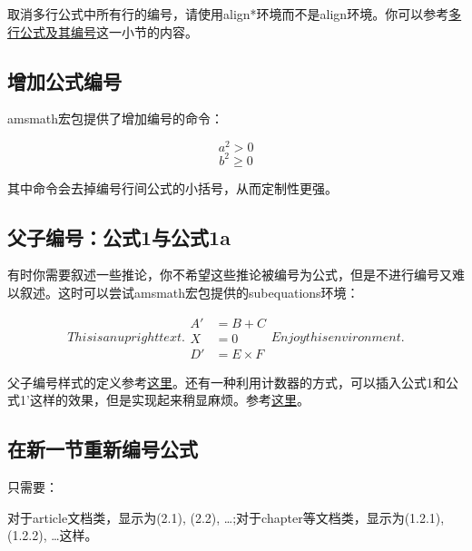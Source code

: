取消多行公式中所有行的编号，请使用align*环境而不是align环境。你可以参考\hyperref[subsec:multieqnum]{多行公式及其编号}这一小节的内容。

\subsection{增加公式编号}
amsmath宏包提供了增加编号的\latexline{\\tag}命令：

\begin{codeshow}
\[a^2>0 \tag{$\star$}\]
\begin{equation}
b^2 \geqslant 0
\tag*{[Axiom]}
\end{equation}
\end{codeshow}

其中\latexline{\\tag*}命令会去掉编号行间公式的小括号，从而定制性更强。

\subsection{父子编号：公式1与公式1a}
有时你需要叙述一些推论，你不希望这些推论被编号为公式，但是不进行编号又难以叙述。这时可以尝试amsmath宏包提供的subequations环境：

\begin{codeshow}
\begin{subequations}
This is an upright text.
\begin{align}
A' &=B+C \\
X &=0 \nonumber \\
D' &=E \times F
\end{align}
Enjoy this environment.
\end{subequations}
\end{codeshow}

父子编号样式的定义参考\hyperref[code:parenteqnum]{这里}。还有一种利用计数器的方式，可以插入公式1和公式1'这样的效果，但是实现起来稍显麻烦。参考\hyperref[code:eq1plus]{这里}。

\subsection{在新一节重新编号公式}
只需要：
\begin{latex}{}
\end{latex}

对于article文档类，显示为(2.1), (2.2), \ldots ;对于chapter等文档类，显示为(1.2.1), (1.2.2), \ldots 这样。


